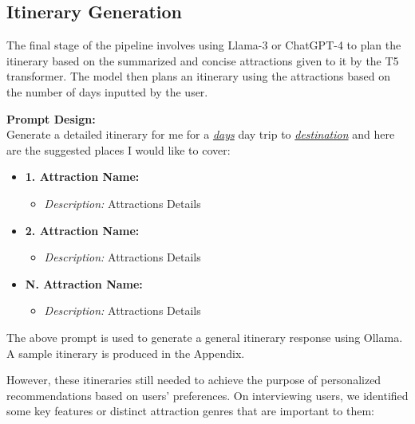 \documentclass[sigconf,authordraft]{acmart}
\begin{document}
\subsection{Itinerary Generation}
The final stage of the pipeline involves using Llama-3 or ChatGPT-4 to plan the itinerary based on the summarized and concise attractions given to it by the T5 transformer. The model then plans an itinerary using the attractions based on the number of days inputted by the user.

\begin{tcolorbox}[linewidth=1pt, innerleftmargin=15pt, innerrightmargin=15pt, innertopmargin=15pt, innerbottommargin=15pt]
  \textbf{Prompt Design:} \\

  Generate a detailed itinerary for me for a \underline{\textit{days}} day trip to  \underline{\textit{destination}} and here are the suggested places I would like to cover:

  \begin{itemize}
      \item \textbf{1. Attraction Name:}
      \begin{itemize}
          \item \textit{Description:} Attractions Details
      \end{itemize}
      \item \textbf{2. Attraction Name:}
      \begin{itemize}
          \item \textit{Description:} Attractions Details
      \end{itemize}
      \vspace{2\baselineskip} %
      \item \textbf{N. Attraction Name:}
      \begin{itemize}
          \item \textit{Description:} Attractions Details
      \end{itemize}
  \end{itemize}
\end{tcolorbox}

The above prompt is used to generate a general itinerary response using Ollama. A sample itinerary is produced in the Appendix.

However, these itineraries still needed to achieve the purpose of personalized recommendations based on users' preferences. On interviewing users, we identified some key features or distinct attraction genres that are important to them:
\end{document}

